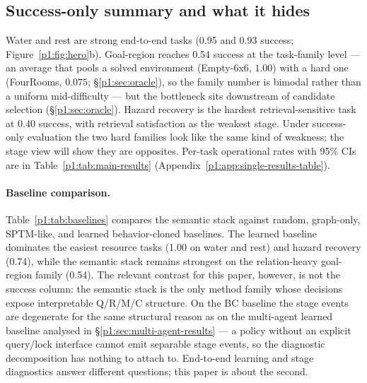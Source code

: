 \documentclass{article}
\begin{document}
\subsection{Success-only summary and what it hides}
\label{p1:sec:single-results}

Water and rest are strong end-to-end tasks (0.95 and 0.93 success; Figure~\ref{p1:fig:hero}b). Goal-region reaches 0.54 success at the task-family level --- an average that pools a solved environment (Empty-6x6, $1.00$) with a hard one (FourRooms, $0.075$; \S\ref{p1:sec:oracle}), so the family number is bimodal rather than a uniform mid-difficulty --- but the bottleneck sits downstream of candidate selection (\S\ref{p1:sec:oracle}). Hazard recovery is the hardest retrieval-sensitive task at 0.40 success, with retrieval satisfaction as the weakest stage. Under success-only evaluation the two hard families look like the same kind of weakness; the stage view will show they are opposites. Per-task operational rates with 95\% CIs are in Table~\ref{p1:tab:main-results} (Appendix~\ref{p1:app:single-results-table}).

\paragraph{Baseline comparison.}
Table~\ref{p1:tab:baselines} compares the semantic stack against random,
graph-only, SPTM-like, and learned behavior-cloned baselines. The
learned baseline dominates the easiest resource tasks (1.00 on water
and rest) and hazard recovery (0.74), while the semantic stack remains
strongest on the relation-heavy goal-region family (0.54). The
relevant contrast for this paper, however, is not the success column:
the semantic stack is the only method family whose decisions expose
interpretable Q/R/M/C structure. On the BC baseline the stage events
are degenerate for the same structural reason as on the multi-agent
learned baseline analysed in \S\ref{p1:sec:multi-agent-results} --- a
policy without an explicit query/lock interface cannot emit separable
stage events, so the diagnostic decomposition has nothing to attach
to. End-to-end learning and stage diagnostics answer different
questions; this paper is about the second.
\end{document}
